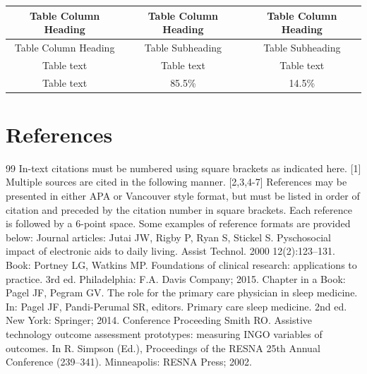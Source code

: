 \documentclass{article}
\begin{document}



\begin{table}[htbp]
\centering
\begin{tabular}{|c|c|c|}
\hline
Table Column Heading & Table Column Heading & Table Column Heading \\
\hline
Table Column Heading & Table Subheading & Table Subheading \\
\hline
Table text & Table text & Table text \\
\hline
Table text & 85.5\% & 14.5\% \\
\hline
\end{tabular}
\end{table}

\section{References}


\begin{thebibliography}{99}
\bibitem{} In-text citations must be numbered using square brackets as indicated here. [1] Multiple sources are cited in the following manner. [2,3,4-7] References may be presented in either APA or Vancouver style format, but must be listed in order of citation and preceded by the citation number in square brackets. Each reference is followed by a 6-point space. Some examples of reference formats are provided below:
\bibitem{} Journal articles:
 Jutai JW, Rigby P, Ryan S, Stickel S. Pyschosocial impact of electronic aids to daily living. Assist Technol. 2000 12(2):123–131.
\bibitem{} Book:
 Portney LG, Watkins MP. Foundations of clinical research: applications to practice. 3rd ed. Philadelphia: F.A. Davis Company; 2015.
\bibitem{} Chapter in a Book:
 Pagel JF, Pegram GV. The role for the primary care physician in sleep medicine. In: Pagel JF, Pandi-Perumal SR, editors. Primary care sleep medicine. 2nd ed. New York: Springer; 2014.
\bibitem{} Conference Proceeding
 Smith RO. Assistive technology outcome assessment prototypes: measuring INGO variables of outcomes. In R. Simpson (Ed.), Proceedings of the RESNA 25th Annual Conference (239–341). Minneapolis: RESNA Press; 2002.
\end{thebibliography}
\end{document}
